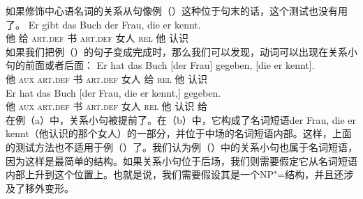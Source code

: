 \noindent
如果修饰中心语名词的关系从句像例（）这种位于句末的话，这个测试也没有用了。
\ea
\gll Er gibt das Buch der Frau, die er kennt.\\
      他 给 \textsc{art}.\textsc{def} 书 \textsc{art}.\textsc{def} 女人 \textsc{rel} 他 认识\\
\z
如果我们把例（）的句子变成完成时，那么我们可以发现，动词可以出现在关系小句的前面或者后面：
\eal
\ex 
\gll Er hat das Buch [der Frau] gegeben, [die er kennt].\\
     他 \textsc{aux} \textsc{art}.\textsc{def} 书 \spacebr{}\textsc{art}.\textsc{def} 女人 给 \spacebr{}\textsc{rel} 他 认识\\
\ex 
\gll Er hat das Buch [der Frau, die er kennt,] gegeben.\\
	 他 \textsc{aux} \textsc{art}.\textsc{def} 书 \spacebr{}\textsc{art}.\textsc{def} 女人 \textsc{rel} 他 认识 给\\
\zl
在例（a）中，关系小句被提前了。在（b）中，它构成了名词短语der Frau, die er kennt（他认识的那个女人）的一部分，并位于中场的名词短语内部。这样，上面的测试方法也不适用于例（）了。我们认为例（）中的关系小句也属于名词短语，因为这样是最简单的结构。如果关系小句位于后场，我们则需要假定它从名词短语内部上升到这个位置上。也就是说，我们需要假设其是一个NP"=结构，并且还涉及了移外变形。
%
